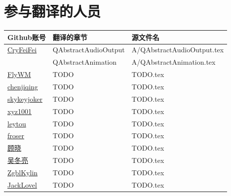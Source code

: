 \chapter{参与翻译的人员}


\centering
\begin{tabular}{lll}
	\toprule
	\cmidrule{1-3}
	 Github账号 & 翻译的章节 & 源文件名 \\
	\midrule
	\href{https://github.com/CryFeiFei}{CryFeiFei} & QAbstractAudioOutput & A/QAbstractAudioOutput.tex  \\
	 & QAbstractAnimation & A/QAbstractAnimation.tex  \\
	\href{https://github.com/FlyWM}{FlyWM}  & TODO & TODO.tex \\
	\href{https://github.com/chenjiqing}{chenjiqing}  & TODO & TODO.tex \\	
	\href{https://github.com/skykeyjoker}{skykeyjoker}  & TODO & TODO.tex \\	
	\href{https://github.com/xyz1001}{xyz1001}  & TODO & TODO.tex \\	
	\href{https://github.com/leytou}{leytou}  & TODO & TODO.tex \\	
	\href{https://github.com/froser}{froser}  & TODO & TODO.tex \\	
	\href{https://github.com/chenyanzz}{顾晓}  & TODO & TODO.tex \\
    \href{https://github.com/abc881858}{吴冬亮}  & TODO & TODO.tex \\	
    \href{https://github.com/ZgblKylin}{ZgblKylin}  & TODO & TODO.tex \\	
	\href{https://github.com/JackLovel}{JackLovel}  & TODO & TODO.tex \\
	\bottomrule
\end{tabular}


